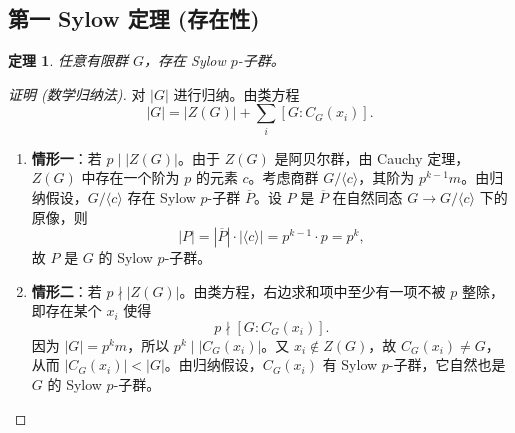 \documentclass[11pt,a4paper]{ctexart}
\newtheorem*{theorem}{定理}
\theoremstyle{remark}
\begin{document}
\subsection*{第一 Sylow 定理 (存在性)}
\begin{theorem}
任意有限群 \(G\)，存在 Sylow \(p\)-子群。
\end{theorem}
\begin{proof}[证明 (数学归纳法)]
对 \(|G|\) 进行归纳。由类方程
\[
|G| = |Z(G)| + \sum_{i} [G : C_G(x_i)].
\]
\begin{enumerate}
    \item \textbf{情形一}：若 \(p \mid |Z(G)|\)。由于 \(Z(G)\) 是阿贝尔群，由 Cauchy 定理，\(Z(G)\) 中存在一个阶为 \(p\) 的元素 \(c\)。考虑商群 \(G/\langle c \rangle\)，其阶为 \(p^{k-1}m\)。由归纳假设，\(G/\langle c\rangle\) 存在 Sylow \(p\)-子群 \(\overline{P}\)。设 \(P\) 是 \(\overline{P}\) 在自然同态 \(G\to G/\langle c\rangle\) 下的原像，则
    \[
    |P| = |\overline{P}|\cdot |\langle c\rangle| = p^{k-1}\cdot p = p^k,
    \]
    故 \(P\) 是 \(G\) 的 Sylow \(p\)-子群。
    
    \item \textbf{情形二}：若 \(p \nmid |Z(G)|\)。由类方程，右边求和项中至少有一项不被 \(p\) 整除，即存在某个 \(x_i\) 使得
    \[
    p \nmid [G : C_G(x_i)].
    \]
    因为 \(|G|=p^k m\)，所以 \(p^k \mid |C_G(x_i)|\)。又 \(x_i\notin Z(G)\)，故 \(C_G(x_i)\neq G\)，从而 \(|C_G(x_i)|<|G|\)。由归纳假设，\(C_G(x_i)\) 有 Sylow \(p\)-子群，它自然也是 \(G\) 的 Sylow \(p\)-子群。
\end{enumerate}
\end{proof}
\end{document}
